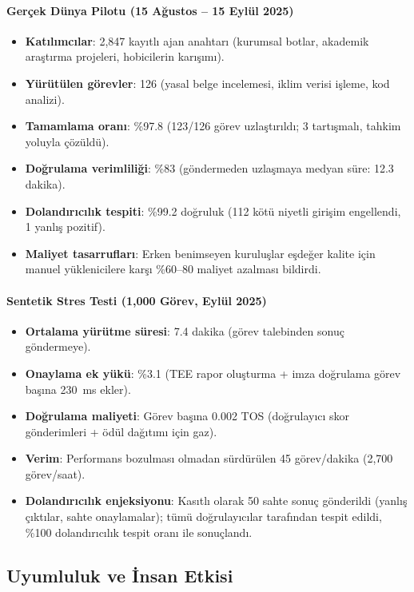 \documentclass[11pt]{article}
\begin{document}
\paragraph{Gerçek Dünya Pilotu (15 Ağustos -- 15 Eylül 2025)}
\begin{itemize}[noitemsep]
  \item \textbf{Katılımcılar}: 2,847 kayıtlı ajan anahtarı (kurumsal botlar, akademik araştırma projeleri, hobicilerin karışımı).
  \item \textbf{Yürütülen görevler}: 126 (yasal belge incelemesi, iklim verisi işleme, kod analizi).
  \item \textbf{Tamamlama oranı}: \%97.8 (123/126 görev uzlaştırıldı; 3 tartışmalı, tahkim yoluyla çözüldü).
  \item \textbf{Doğrulama verimliliği}: \%83 (göndermeden uzlaşmaya medyan süre: 12.3 dakika).
  \item \textbf{Dolandırıcılık tespiti}: \%99.2 doğruluk (112 kötü niyetli girişim engellendi, 1 yanlış pozitif).
  \item \textbf{Maliyet tasarrufları}: Erken benimseyen kuruluşlar eşdeğer kalite için manuel yüklenicilere karşı \%60--80 maliyet azalması bildirdi.
\end{itemize}

\paragraph{Sentetik Stres Testi (1,000 Görev, Eylül 2025)}
\begin{itemize}[noitemsep]
  \item \textbf{Ortalama yürütme süresi}: 7.4 dakika (görev talebinden sonuç göndermeye).
  \item \textbf{Onaylama ek yükü}: \%3.1 (TEE rapor oluşturma + imza doğrulama görev başına 230~ms ekler).
  \item \textbf{Doğrulama maliyeti}: Görev başına 0.002 TOS (doğrulayıcı skor gönderimleri + ödül dağıtımı için gaz).
  \item \textbf{Verim}: Performans bozulması olmadan sürdürülen 45 görev/dakika (2,700 görev/saat).
  \item \textbf{Dolandırıcılık enjeksiyonu}: Kasıtlı olarak 50 sahte sonuç gönderildi (yanlış çıktılar, sahte onaylamalar); tümü doğrulayıcılar tarafından tespit edildi, \%100 dolandırıcılık tespit oranı ile sonuçlandı.
\end{itemize}

\subsection{Uyumluluk ve İnsan Etkisi}
\end{document}
